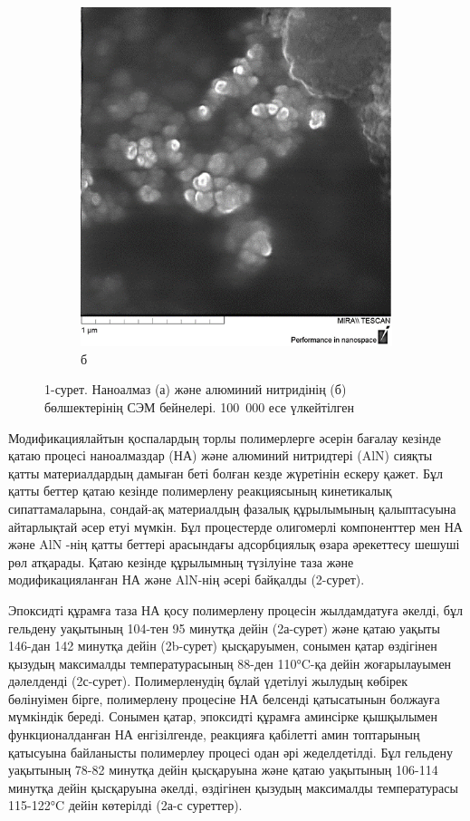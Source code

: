 \begin{figure}[H]
\begin{subfigure}[t]{0.45\textwidth}
        \includegraphics[width=\textwidth]{media/chem/image18}
        \caption*{б}
    \end{subfigure}
    \caption*{1-сурет. Наноалмаз (а) және алюминий нитридінің (б)
бөлшектерінің СЭМ бейнелері. 100~000 есе үлкейтілген}
\end{figure}

\begin{multicols}{2}
Модификациялайтын қоспалардың торлы полимерлерге әсерін бағалау кезінде
қатаю процесі наноалмаздар (НА) және алюминий нитридтері (AlN) сияқты
қатты материалдардың дамыған беті болған кезде жүретінін ескеру қажет.
Бұл қатты беттер қатаю кезінде полимерлену реакциясының кинетикалық
сипаттамаларына, сондай-ақ материалдың фазалық құрылымының қалыптасуына
айтарлықтай әсер етуі мүмкін. Бұл процестерде олигомерлі компоненттер
мен НА және AlN -нің қатты беттері арасындағы адсорбциялық өзара
әрекеттесу шешуші рөл атқарады. Қатаю кезінде құрылымның түзілуіне таза
және модификацияланған НА және AlN-нің әсері байқалды (2-сурет).

Эпоксидті құрамға таза НА қосу полимерлену процесін жылдамдатуға әкелді,
бұл гельдену уақытының 104-тен 95 минутқа дейін (2а-сурет) және қатаю
уақыты 146-дан 142 минутқа дейін (2b-сурет) қысқаруымен, сонымен қатар
өздігінен қызудың максималды температурасының 88-ден 110°C-қа дейін
жоғарылауымен дәлелденді (2с-сурет). Полимерленудің бұлай үдетілуі
жылудың көбірек бөлінуімен бірге, полимерлену процесіне НА белсенді
қатысатынын болжауға мүмкіндік береді. Сонымен қатар, эпоксидті құрамға
аминсірке қышқылымен функционалданған НА енгізілгенде, реакцияға
қабілетті амин топтарының қатысуына байланысты полимерлеу процесі одан
әрі жеделдетілді. Бұл гельдену уақытының 78-82 минутқа дейін қысқаруына
және қатаю уақытының 106-114 минутқа дейін қысқаруына әкелді, өздігінен
қызудың максималды температурасы 115-122°C дейін көтерілді (2а-с
суреттер).
\end{multicols}

